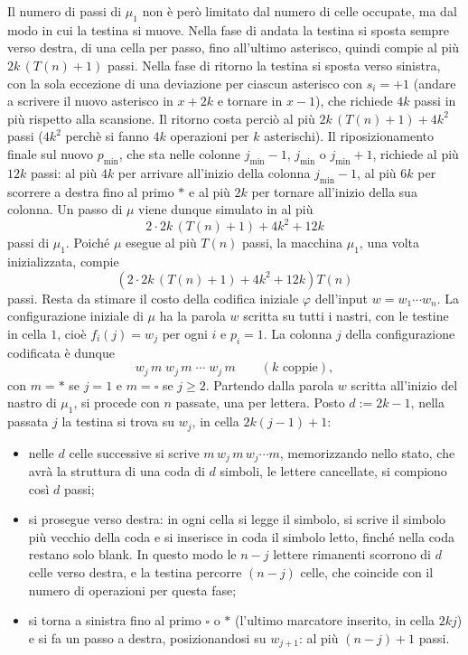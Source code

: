 Il numero di passi di $\mu_1$ non è però limitato dal numero di celle occupate, ma dal modo
in cui la testina si muove. Nella fase di andata la testina si sposta sempre verso destra,
di una cella per passo, fino all'ultimo asterisco, quindi compie al più $2k\,(T(n)+1)$
passi. Nella fase di ritorno la testina si sposta verso sinistra, con la sola eccezione di
una deviazione per ciascun asterisco con $s_i = +1$ (andare a 
scrivere il nuovo asterisco
in $x+2k$ e tornare in $x-1$), 
che richiede $4k$ passi in più rispetto alla scansione.
Il ritorno costa perciò al più 
$2k\,(T(n)+1) + 4k^2$ passi ($4k^2$ perchè si fanno $4k$ operazioni per $k$ asterischi). Il riposizionamento finale
sul nuovo $p_{\min}$, che sta nelle colonne $j_{\min}-1$, $j_{\min}$ o $j_{\min}+1$,
richiede al più $12k$ passi: al più $4k$ per arrivare all'inizio della colonna
$j_{\min}-1$, al più $6k$ per scorrere a destra fino al primo $*$ e al più $2k$ per tornare
all'inizio della sua colonna. Un passo di $\mu$ viene dunque simulato in al più
\[
  2\cdot 2k\,(T(n)+1) + 4k^2 + 12k
\]
passi di $\mu_1$.
Poiché $\mu$ esegue al più $T(n)$ passi, 
la macchina $\mu_1$, una volta inizializzata, 
compie
\[
 (2\cdot 2k\,(T(n)+1) + 4k^2 + 12k) T(n)
\]
passi.
Resta da stimare il costo della codifica iniziale $\varphi$ dell'input
$w = w_1\cdots w_n$. La configurazione iniziale di $\mu$ ha la parola $w$ scritta su tutti
i nastri, con le testine in cella $1$, cioè $f_i(j) = w_j$ per ogni $i$ e $p_i = 1$.
La colonna $j$ della configurazione codificata è dunque
\[
  w_j\, m\; w_j\, m\; \cdots\; w_j\, m \qquad (k \text{ coppie}),
\]
con $m = *$ se $j = 1$ e $m = \square$ se $j \geq 2$. Partendo dalla parola $w$ scritta
all'inizio del nastro di $\mu_1$, si procede con $n$ passate, una per lettera. Posto
$d := 2k-1$, nella passata $j$ la testina si trova su $w_j$, in cella $2k(j-1)+1$:
\begin{itemize}
  \item nelle $d$ celle successive si scrive $m\,w_j\,m\,w_j\cdots m$, memorizzando nello
        stato, che avrà la struttura di una coda di $d$ simboli, le lettere cancellate, si compiono così $d$ passi;
  \item si prosegue verso destra: in ogni cella si legge il simbolo, si scrive il simbolo
        più vecchio della coda e si inserisce in coda il simbolo letto, finché nella coda
        restano solo blank. In questo modo le $n-j$ lettere rimanenti scorrono di $d$
        celle verso destra, e la testina percorre $ (n-j)$ celle, che coincide con il numero di operazioni per questa fase;
  \item si torna a sinistra fino al primo $\square$ o $*$ (l'ultimo marcatore inserito, in
        cella $2kj$) e si fa un passo a destra, posizionandosi su $w_{j+1}$: al più
        $(n-j)+1$ passi.
\end{itemize}
